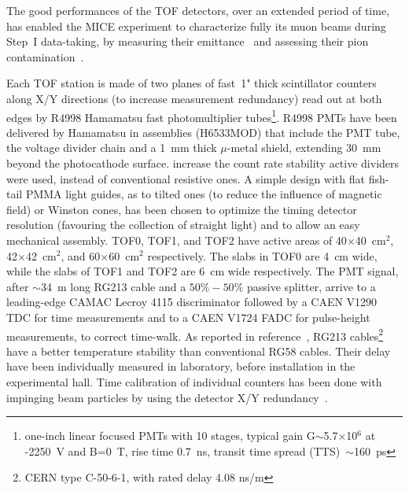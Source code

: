The good performances of the TOF detectors, over an extended period of time,
has enabled the MICE experiment to characterize fully its muon beams during
Step~I data-taking, by measuring their emittance~\cite{2013arXiv1306.1509T} and
assessing their pion contamination~\cite{2016JInst..11P3001A}.

Each TOF station is made of two planes of fast~1" thick scintillator counters
along X/Y directions (to increase measurement redundancy) read out at both edges by
R4998 Hamamatsu fast photomultiplier tubes\footnote{one-inch linear
focused PMTs with 10 stages, typical gain G$\sim$5.7$\times$10$^6$
at -2250~V and B=0~T, rise time 0.7~ns, transit time spread (TTS)~$\sim$160~ps}.
R4998 PMTs have been delivered by Hamamatsu in assemblies (H6533MOD) that
include the PMT tube, the voltage divider chain and a 1~mm thick $\mu$-metal
shield, extending 30~mm beyond the photocathode surface.
 increase the count rate stability active dividers were used, instead of
conventional resistive ones.
A simple design with flat fish-tail PMMA light guides, as  to tilted ones
(to reduce the influence of magnetic field) or Winston cones, has
been chosen to optimize the timing detector resolution (favouring
the collection of straight light) and to allow an easy mechanical
assembly. 
TOF0, TOF1, and TOF2 have active areas of 40$\times$40~cm$^2$, 42$\times$42~cm$^2$, and 60$\times$60~cm$^2$ respectively.
The slabs in TOF0 are 4~cm wide, while the slabs of TOF1 and TOF2 are 6~cm wide respectively.
The PMT signal, after $\sim$34~m long RG213 cable and a $50\%-50\%$ passive
splitter, arrive to a leading-edge CAMAC Lecroy 4115 discriminator
followed by a CAEN V1290 TDC for time measurements and to a CAEN V1724 FADC
for pulse-height measurements, to correct time-walk. As reported in
reference~\cite{NOTE241}, RG213 cables\footnote{CERN type C-50-6-1, with
rated delay 4.08 ns/m} have a better temperature stability
than conventional RG58 cables. Their delay have been individually measured
in laboratory, before installation in the experimental hall.
Time calibration of individual counters has been done with impinging beam particles by using the detector
X/Y redundancy~\cite{NOTE251}. 

